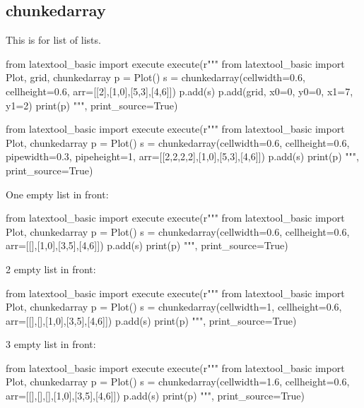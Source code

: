 \subsection{chunkedarray}

This is for list of lists.

\begin{python}
from latextool_basic import execute
execute(r"""
from latextool_basic import Plot, grid, chunkedarray
p = Plot()
s = chunkedarray(cellwidth=0.6,
                 cellheight=0.6,
                 arr=[[2],[1,0],[5,3],[4,6]])
p.add(s)
p.add(grid, x0=0, y0=0, x1=7, y1=2)
print(p)
""", print_source=True)
\end{python}

\begin{python}
from latextool_basic import execute
execute(r"""
from latextool_basic import Plot, chunkedarray
p = Plot()
s = chunkedarray(cellwidth=0.6,
                 cellheight=0.6,
                 pipewidth=0.3,
                 pipeheight=1,
                 arr=[[2,2,2,2],[1,0],[5,3],[4,6]])
p.add(s)
print(p)
""", print_source=True)
\end{python}



One empty list in front:
\begin{python}
from latextool_basic import execute
execute(r"""
from latextool_basic import Plot, chunkedarray
p = Plot()
s = chunkedarray(cellwidth=0.6,
                 cellheight=0.6,
                   arr=[[],[1,0],[3,5],[4,6]])
p.add(s)
print(p)
""", print_source=True)
\end{python}



2 empty list in front:
\begin{python}
from latextool_basic import execute
execute(r"""
from latextool_basic import Plot, chunkedarray
p = Plot()
s = chunkedarray(cellwidth=1,
                 cellheight=0.6,
                   arr=[[],[],[1,0],[3,5],[4,6]])
p.add(s)
print(p)
""", print_source=True)
\end{python}




3 empty list in front:
\begin{python}
from latextool_basic import execute
execute(r"""
from latextool_basic import Plot, chunkedarray
p = Plot()
s = chunkedarray(cellwidth=1.6,
                 cellheight=0.6,
                 arr=[[],[],[],[1,0],[3,5],[4,6]])
p.add(s)
print(p)
""", print_source=True)
\end{python}



